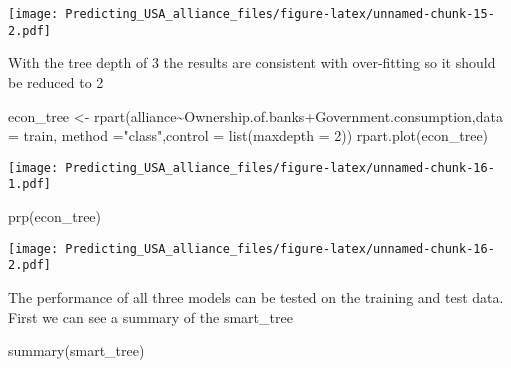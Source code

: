 \documentclass[
]{article}
\newenvironment{Shaded}{\begin{snugshade}}{\end{snugshade}}
\newcommand{\AttributeTok}[1]{\textcolor[rgb]{0.77,0.63,0.00}{#1}}
\newcommand{\DecValTok}[1]{\textcolor[rgb]{0.00,0.00,0.81}{#1}}
\newcommand{\FunctionTok}[1]{\textcolor[rgb]{0.00,0.00,0.00}{#1}}
\newcommand{\NormalTok}[1]{#1}
\newcommand{\OtherTok}[1]{\textcolor[rgb]{0.56,0.35,0.01}{#1}}
\newcommand{\SpecialCharTok}[1]{\textcolor[rgb]{0.00,0.00,0.00}{#1}}
\newcommand{\StringTok}[1]{\textcolor[rgb]{0.31,0.60,0.02}{#1}}
\begin{document}
\texttt{[image: Predicting\_USA\_alliance\_files/figure-latex/unnamed-chunk-15-2.pdf]}

With the tree depth of 3 the results are consistent with over-fitting so
it should be reduced to 2

\begin{Shaded}
\begin{Highlighting}[]
\NormalTok{econ\_tree }\OtherTok{\textless{}{-}} \FunctionTok{rpart}\NormalTok{(alliance}\SpecialCharTok{\textasciitilde{}}\NormalTok{Ownership.of.banks}\SpecialCharTok{+}\NormalTok{Government.consumption,}\AttributeTok{data =}\NormalTok{ train, }\AttributeTok{method =}\StringTok{"class"}\NormalTok{,}\AttributeTok{control =} \FunctionTok{list}\NormalTok{(}\AttributeTok{maxdepth =} \DecValTok{2}\NormalTok{))}
\FunctionTok{rpart.plot}\NormalTok{(econ\_tree)}
\end{Highlighting}
\end{Shaded}

\texttt{[image: Predicting\_USA\_alliance\_files/figure-latex/unnamed-chunk-16-1.pdf]}

\begin{Shaded}
\begin{Highlighting}[]
\FunctionTok{prp}\NormalTok{(econ\_tree)}
\end{Highlighting}
\end{Shaded}

\texttt{[image: Predicting\_USA\_alliance\_files/figure-latex/unnamed-chunk-16-2.pdf]}

The performance of all three models can be tested on the training and
test data. First we can see a summary of the smart\_tree

\begin{Shaded}
\begin{Highlighting}[]
\FunctionTok{summary}\NormalTok{(smart\_tree)}
\end{Highlighting}
\end{Shaded}
\end{document}
